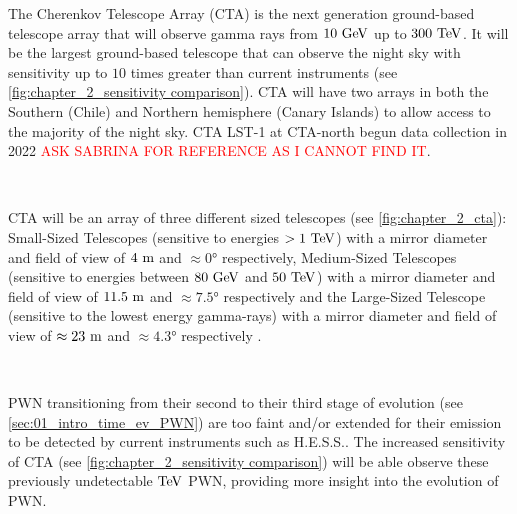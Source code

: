 The Cherenkov Telescope Array (CTA) is the next generation ground-based telescope array that will observe gamma rays from $10~\si{\giga\electronvolt}$ up to $300~\TeV$. It will be the largest ground-based telescope that can observe the night sky with sensitivity up to $10$ times greater than current instruments (see \autoref{fig:chapter_2_sensitivity comparison}). CTA will have two arrays in both the Southern (Chile) and Northern hemisphere (Canary Islands) to allow access to the majority of the night sky. CTA LST-1 at CTA-north begun data collection in 2022 \textcolor{red}{ASK SABRINA FOR REFERENCE AS I CANNOT FIND IT}.
\par~\par
CTA will be an array of three different sized telescopes (see \autoref{fig:chapter_2_cta}): Small-Sized Telescopes (sensitive to energies $>1~\TeV$) with a mirror diameter and field of view of $4~\si{\meter}$ and $\approx\ang{0}$ respectively, Medium-Sized Telescopes (sensitive to energies between $80~\si{\giga\electronvolt}$ and $50~\TeV$) with a mirror diameter and field of view of $11.5~\si{\meter}$ and $\approx\ang{7.5}$ respectively and the Large-Sized Telescope (sensitive to the lowest energy gamma-rays) with a mirror diameter and field of view of $\approx 23~\si{\meter}$ and $\approx\ang{4.3}$ respectively \citep{cherenkov_telescope_array,2019scta.book.....C}.
\par~\par
PWN transitioning from their second to their third stage of evolution (see \autoref{sec:01_intro_time_ev_PWN}) are too faint and/or extended for their emission to be detected by current instruments such as H.E.S.S.. The increased sensitivity of CTA (see \autoref{fig:chapter_2_sensitivity comparison}) will be able observe these previously undetectable $\TeV$ PWN, providing more insight into the evolution of PWN.